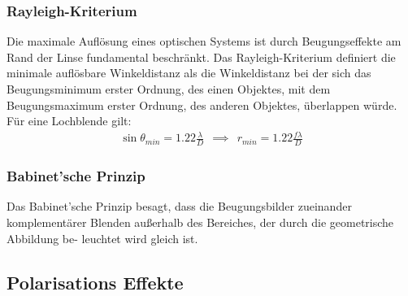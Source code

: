 \documentclass[twocolumn, unnumberedsubsub]{summery_5.0} %
\begin{document}
\subsubsection{Rayleigh-Kriterium}
Die maximale Auflösung eines optischen Systems ist durch Beugungseffekte am 
Rand der Linse fundamental beschränkt. 
Das Rayleigh-Kriterium definiert die minimale auflösbare Winkeldistanz
als die Winkeldistanz bei der 
sich das Beugungsminimum erster Ordnung, des einen Objektes, mit dem
Beugungsmaximum erster Ordnung, des anderen Objektes, überlappen würde. 
Für eine Lochblende gilt:
\begin{align*}
    \sin\theta_{min} =  1.22 \frac{\lambda}{D}
    \ \ \implies \ \ r_{min} =  1.22 \frac{f \lambda}{D}
\end{align*}

\subsubsection{Babinet'sche Prinzip}
Das Babinet'sche Prinzip besagt, dass die Beugungsbilder zueinander komplementärer
Blenden außerhalb des Bereiches, der durch die geometrische Abbildung be-
leuchtet wird gleich ist.

\subsection{Polarisations Effekte}
\end{document}
